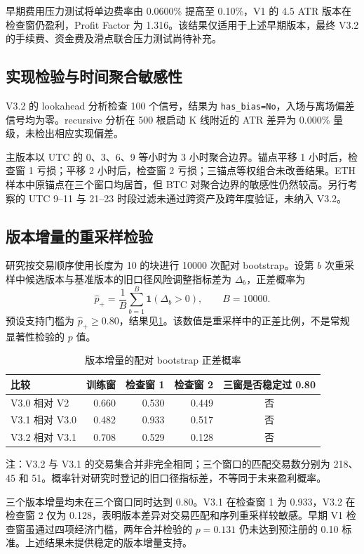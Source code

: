 早期费用压力测试将单边费率由 0.0600\% 提高至 0.10\%，V1 的 4.5 ATR 版本在检查窗仍盈利，Profit Factor 为 1.316。该结果仅适用于上述早期版本，最终 V3.2 的手续费、资金费及滑点联合压力测试尚待补充。

\subsection{实现检验与时间聚合敏感性}

V3.2 的 lookahead 分析检查 100 个信号，结果为 \texttt{has\_bias=No}，入场与离场偏差信号均为零。recursive 分析在 500 根启动 K 线附近的 ATR 差异为 0.000\% 量级，未检出相应实现偏差\cite{freqtrade_lookahead,freqtrade_recursive}。

主版本以 UTC 的 0、3、6、9 等小时为 3 小时聚合边界。锚点平移 1 小时后，检查窗 1 亏损；平移 2 小时后，检查窗 2 亏损；三锚点等权组合未改善结果。ETH 样本中原锚点在三个窗口均居首，但 BTC 对聚合边界的敏感性仍然较高。另行考察的 UTC 9--11 与 21--23 时段过滤未通过跨资产及跨年度验证，未纳入 V3.2。

\subsection{版本增量的重采样检验}

研究按交易顺序使用长度为 10 的块进行 10000 次配对 bootstrap。设第 $b$ 次重采样中候选版本与基准版本的旧口径风险调整指标差为 $\Delta_b$，正差概率为
\begin{equation}
  \widehat p_{+}=\frac{1}{B}\sum_{b=1}^{B}\mathbf{1}(\Delta_b>0),\qquad B=10000.
  \label{eq:bootstrap-prob}
\end{equation}
预设支持门槛为 $\widehat p_{+}\ge0.80$，结果见\cref{tab:bootstrap}。该数值是重采样中的正差比例，不是常规显著性检验的 $p$ 值。

\begin{table}[H]
  \centering
  \caption{版本增量的配对 bootstrap 正差概率}
  \label{tab:bootstrap}
  \begin{threeparttable}
    \begin{tabular}{lrrrc}
      \toprule
      比较 & 训练窗 & 检查窗 1 & 检查窗 2 & 三窗是否稳定过 0.80\\
      \midrule
      V3.0 相对 V2 & 0.660 & 0.530 & 0.449 & 否\\
      V3.1 相对 V3.0 & 0.482 & 0.933 & 0.517 & 否\\
      V3.2 相对 V3.1 & 0.708 & 0.529 & 0.128 & 否\\
      \bottomrule
    \end{tabular}
    \begin{tablenotes}[flushleft]\footnotesize
      \item 注：V3.2 与 V3.1 的交易集合并非完全相同；三个窗口的匹配交易数分别为 218、45 和 51。概率针对研究时登记的旧口径指标差，不等同于未来盈利概率。
    \end{tablenotes}
  \end{threeparttable}
\end{table}

三个版本增量均未在三个窗口同时达到 0.80。V3.1 在检查窗 1 为 0.933，V3.2 在检查窗 2 仅为 0.128，表明版本差异对交易匹配和序列重采样较敏感。早期 V1 检查窗虽通过四项经济门槛，两年合并检验的 $p=0.131$ 仍未达到预注册的 0.10 标准。上述结果未提供稳定的版本增量支持。
